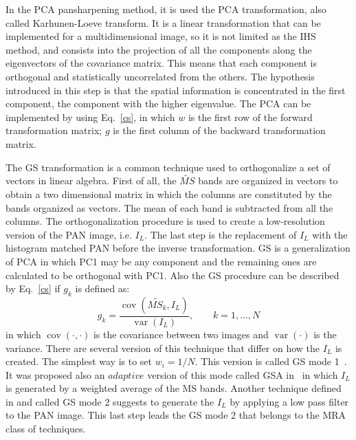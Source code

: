\documentclass[12pt]{report}
\begin{document}
In the PCA pansharpening method, it is used the PCA transformation, also called Karhunen-Loeve transform. It is a linear transformation that can be implemented for a multidimensional image, so it is not limited as the IHS method, and consists into the projection of all the components along the eigenvectors of the covariance matrix. This means that each component is orthogonal and statistically uncorrelated from the others. The hypothesis introduced in this step is that the spatial information is concentrated in the first component, the component with the higher eigenvalue. The PCA can be implemented by using Eq.~\ref{cs}, in which $w$ is the first row of the forward transformation matrix; $g$ is the first column of the backward transformation matrix.

The GS transformation is a common technique used to orthogonalize a set of vectors in linear algebra.
First of all, the $\widetilde{MS}$ bands are organized in vectors to obtain a two dimensional matrix in which the columns are constituted by the bands organized as vectors. The mean of each band is subtracted from all the columns. The orthogonalization procedure is used to create a low-resolution version of the PAN image, i.e. $I_L$.  The last step is the replacement of $I_L$ with the histogram matched PAN before the inverse transformation. GS is a generalization of PCA in which PC1 may be any component and the remaining ones are calculated to be orthogonal with PC1. Also the GS procedure can be described by Eq.~\ref{cs} if $g_k$ is defined as:
%
\begin{equation}
    g_k = \frac{\operatorname{cov}(\widetilde{MS_k}, I_L)}{\operatorname{var}(I_L)} , \qquad k = 1,\dots,N
    \label{gsgk}
\end{equation}
%
in which $\operatorname{cov}(\cdot,\cdot)$ is the covariance between two images and $\operatorname{var}(\cdot)$ is the variance.
There are several version of this technique that differ on how the $I_L$ is
created. The simplest way is to set $w_i = 1/N$. This version is called 
GS mode 1~\cite{gs}. It was proposed also an $adaptive$ version of this mode 
called GSA in~\cite{cs3} in which $I_L$ is generated by a weighted average of 
the MS bands. Another technique defined in \cite{gs} and called GS mode 2 
suggests to generate the $I_L$ by applying a low pass filter to the PAN image. 
This last step leads the GS mode 2 that belongs to the MRA class of techniques.
\end{document}
